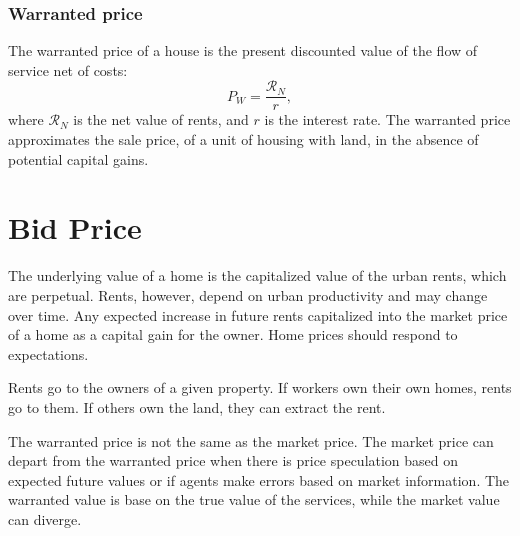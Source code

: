 

\subsubsection{Warranted price}

The \gls{warranted price} of a house is the present discounted value of the flow of service net of costs:
\begin{equation}
  P_W=\frac{\mathcal{R}_N}{r},  
\label{eqn-price-warranted}
\end{equation}
where $\mathcal{R}_N$ is the net value of rents, and $r$ is the interest rate.  The warranted price approximates the sale price, of a unit of housing with land, in the absence of potential capital gains. 


\section{Bid Price}

The underlying value of a home is the capitalized value of the urban rents, which are perpetual.  Rents, however, depend on urban productivity and may change over time. Any expected increase in future rents capitalized into the market price of a home as a capital gain for the owner. Home prices should respond to expectations.

Rents go to the owners of a given property. If workers own their own homes, rents go to them. If others own the land, they can extract the rent. 

The warranted price is not the same as the market price.  The market price can depart from the warranted price when there is price speculation based on expected future values or if agents make errors based on market information.
The warranted value is base on the true value of the services, while the market value can diverge. 

